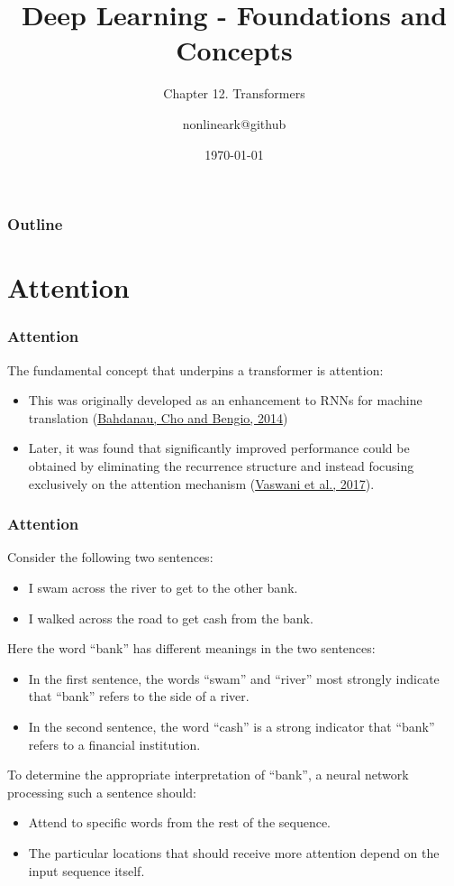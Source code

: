 \documentclass{beamer}
\title{Deep Learning - Foundations and Concepts}
\subtitle{Chapter 12. Transformers}
\author{nonlineark@github}
\date{\today}
\begin{document}
\begin{frame}
    \titlepage
\end{frame}

\begin{frame}
    \frametitle{Outline}
    \tableofcontents
\end{frame}

\section{Attention}

\begin{frame}
    \frametitle{Attention}
    The fundamental concept that underpins a transformer is attention:
    \begin{itemize}
        \item This was originally developed as an enhancement to RNNs for machine translation (\href{https://arxiv.org/abs/1409.0473}{Bahdanau, Cho and Bengio, 2014})
        \item Later, it was found that significantly improved performance could be obtained by eliminating the recurrence structure and instead focusing exclusively on the attention mechanism (\href{https://arxiv.org/abs/1706.03762}{Vaswani et al., 2017}).
    \end{itemize}
\end{frame}

\begin{frame}
    \frametitle{Attention}
    Consider the following two sentences:
    \begin{itemize}
        \item I swam across the river to get to the other bank.
        \item I walked across the road to get cash from the bank.
    \end{itemize}
    Here the word ``bank'' has different meanings in the two sentences:
    \begin{itemize}
        \item In the first sentence, the words ``swam'' and ``river'' most strongly indicate that ``bank'' refers to the side of a river.
        \item In the second sentence, the word ``cash'' is a strong indicator that ``bank'' refers to a financial institution.
    \end{itemize}
    To determine the appropriate interpretation of ``bank'', a neural network processing such a sentence should:
    \begin{itemize}
        \item Attend to specific words from the rest of the sequence.
        \item The particular locations that should receive more attention depend on the input sequence itself.
    \end{itemize}
\end{frame}
\end{document}
